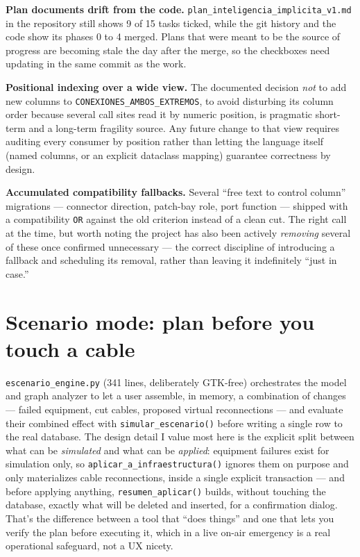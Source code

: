 \documentclass[10.4pt,twocolumn]{article}
\begin{document}
\textbf{Plan documents drift from the code.} \texttt{plan\_inteligencia\_implicita\_v1.md} in the repository still shows 9 of 15 tasks ticked, while the git history and the code show its phases 0 to 4 merged. Plans that were meant to be the source of progress are becoming stale the day after the merge, so the checkboxes need updating in the same commit as the work.

\textbf{Positional indexing over a wide view.} The documented decision \emph{not} to add new columns to \texttt{CONEXIONES\_AMBOS\_EXTREMOS}, to avoid disturbing its column order because several call sites read it by numeric position, is pragmatic short-term and a long-term fragility source. Any future change to that view requires auditing every consumer by position rather than letting the language itself (named columns, or an explicit dataclass mapping) guarantee correctness by design.

\textbf{Accumulated compatibility fallbacks.} Several ``free text to control column'' migrations --- connector direction, patch-bay role, port function --- shipped with a compatibility \texttt{OR} against the old criterion instead of a clean cut. The right call at the time, but worth noting the project has also been actively \emph{removing} several of these once confirmed unnecessary --- the correct discipline of introducing a fallback and scheduling its removal, rather than leaving it indefinitely ``just in case.''

\section{Scenario mode: plan before you touch a cable}

\texttt{escenario\_engine.py} (341 lines, deliberately GTK-free) orchestrates the model and graph analyzer to let a user assemble, in memory, a combination of changes --- failed equipment, cut cables, proposed virtual reconnections --- and evaluate their combined effect with \texttt{simular\_escenario()} before writing a single row to the real database. The design detail I value most here is the explicit split between what can be \emph{simulated} and what can be \emph{applied}: equipment failures exist for simulation only, so \texttt{aplicar\_a\_infraestructura()} ignores them on purpose and only materializes cable reconnections, inside a single explicit transaction --- and before applying anything, \texttt{resumen\_aplicar()} builds, without touching the database, exactly what will be deleted and inserted, for a confirmation dialog. That's the difference between a tool that ``does things'' and one that lets you verify the plan before executing it, which in a live on-air emergency is a real operational safeguard, not a UX nicety.
\end{document}
